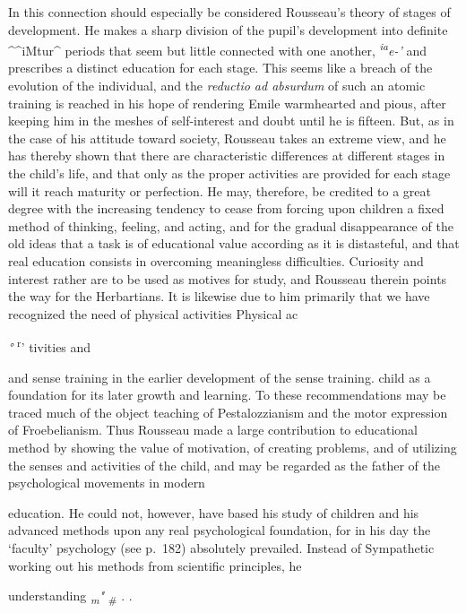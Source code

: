\documentclass[]{book}
\begin{document}
In this connection should especially be considered Rousseau's theory of stages of development. He makes\protect\hypertarget{ch19.xmlux5cux23para.278.1.0.box.138.233.1266.1232.q.60}{}{ a sharp division of the pupil's development into definite \^{}\^{}iMtur\^{} periods that seem but little connected with one another, \emph{\textsuperscript{ia}e-'} and prescribes a distinct education for each stage. This seems like a breach of the evolution of the individual, and the \emph{reductio ad absurdum} of such an atomic training is reached in his hope of rendering Emile warmhearted and pious, after keeping him in the meshes of self-interest and doubt until he is fifteen. But, as in the case of his attitude toward society, Rousseau takes an extreme view, and he has thereby shown that there are characteristic differences at different stages in the child's life, and that only as the proper activities are provided for each stage will it reach maturity or perfection. He may, therefore, be credited to a great degree with the increasing tendency to cease from forcing upon children a fixed method of thinking, feeling, and acting, and for the gradual disappearance of the old ideas that a task is of educational value according as it is distasteful, and that real education consists in overcoming meaningless difficulties. Curiosity and interest rather are to be used as motives for study, and Rousseau therein points the way for the Herbartians. It is likewise due to him primarily that we have recognized the need of physical activities Physical ac}

\emph{°} \textsuperscript{r}' tivities and

and sense training in the earlier development of the sense training. child as a foundation for its later growth and learning. To these recommendations may be traced much of the object teaching of Pestalozzianism and the motor expression of Froebelianism. Thus Rousseau made a large contribution to educational method by showing the value of motivation, of creating problems, and of utilizing the senses and activities of the child, and may be regarded as the father of the psychological movements in modern

education. He could not, however, have based his study of children and his advanced methods upon any real psychological foundation, for in his day the `faculty' psychology (see p.~182) absolutely prevailed. Instead of Sympathetic working out his methods from scientific principles, he

understanding \emph{\textsubscript{m}"} \textsubscript{\#} . .
\end{document}
